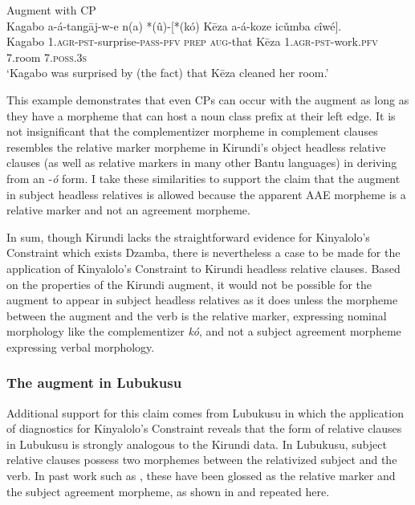 \documentclass[output=paper,colorlinks,citecolor=brown
]{langscibook}
\begin{document}
\ea \label{ex:myers:augcp} Augment with CP \citep[23]{Morgunova:2023} \\
\gll Kagabo a-á-tangāj-w-e n(a) *(û)-[*(kó) Kēza a-á-koze icǔmba cîwé].\\
Kagabo \textsc{1.agr-pst}-surprise-\textsc{pass-pfv} \textsc{prep} \textsc{aug}-that Kēza \textsc{1.agr-pst}-work.\textsc{pfv} 7.room 7.\textsc{poss.3s}\\
\glt `Kagabo was surprised by (the fact) that Kēza cleaned her room.'
\z 

\noindent This example demonstrates that even CPs can occur with the augment as long as they have a morpheme that can host a noun class prefix at their left edge. It is not insignificant that the complementizer morpheme in complement clauses resembles the relative marker morpheme in Kirundi's object headless relative clauses (as well as relative markers in many other Bantu languages) in deriving from an -\emph{ó} form. I take these similarities to support the claim that the augment in subject headless relatives is allowed because the apparent AAE morpheme is a relative marker and not an agreement morpheme.

In sum, though Kirundi lacks the straightforward evidence for Kinyalolo's Constraint which exists Dzamba, there is nevertheless a case to be made for the application of Kinyalolo's Constraint to Kirundi headless relative clauses. Based on the properties of the Kirundi augment, it would not be possible for the augment to appear in subject headless relatives as it does unless the morpheme between the augment and the verb is the relative marker, expressing nominal morphology like the complementizer \emph{kó}, and not a subject agreement morpheme expressing verbal morphology. 

 \subsubsection{The augment in Lubukusu} \label{sec:myers:lubb}

 Additional support for this claim comes from Lubukusu in which the application of diagnostics for Kinyalolo's Constraint reveals that the form of relative clauses in Lubukusu is strongly analogous to the Kirundi data. In Lubukusu, subject relative clauses possess two morphemes between the relativized subject and the verb. In past work such as \citet{Diercks:2010}, these have been glossed as the relative marker and the subject agreement morpheme, as shown in  and repeated here.
\end{document}
